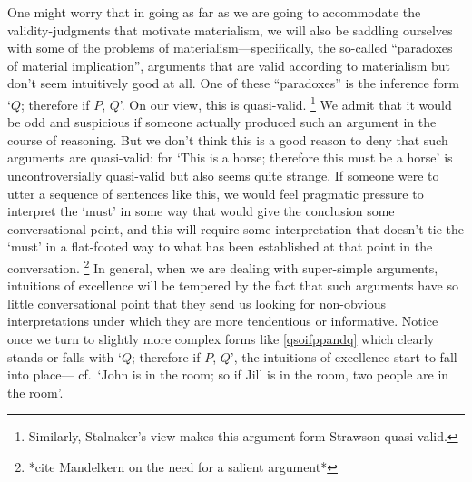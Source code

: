 \documentclass[If.tex]{subfiles}
\begin{document}
\begin{prop}
One might worry that in going as far as we are going to accommodate the validity-judgments that motivate materialism, we will also be saddling ourselves with some of the problems of materialism---specifically, the so-called “paradoxes of material implication”, arguments that are valid according to materialism but don't seem intuitively good at all. One of these “paradoxes” is the inference form ‘$Q$; therefore if $P$, $Q$’. On our view, this is quasi-valid.%
\footnote{Similarly, Stalnaker's view makes this argument form Strawson-quasi-valid.}
We admit that it would be odd and suspicious if someone actually produced such an argument in the course of reasoning. But we don't think this is a good reason to deny that such arguments are quasi-valid: for ‘This is a horse; therefore this must be a horse’ is uncontroversially quasi-valid but also seems quite strange. If someone were to utter a sequence of sentences like this, we would feel pragmatic pressure to interpret the ‘must’ in some way that would give the conclusion some conversational point, and this will require some interpretation that doesn't tie the ‘must’ in a flat-footed way to what has been established at that point in the conversation.%
\footnote{*cite Mandelkern on the need for a salient argument*} 
In general, when we are dealing with super-simple arguments, intuitions of excellence will be tempered by the fact that such arguments have so little conversational point that they send us looking for non-obvious interpretations under which they are more tendentious or informative. Notice once we turn to slightly more complex forms like \ref{qsoifppandq} which clearly stands or falls with ‘$Q$; therefore if $P$, $Q$’, the intuitions of excellence start to fall into place--- cf.\ ‘John is in the room; so if Jill is in the room, two people are in the room’.  


\end{prop}
\end{document}
